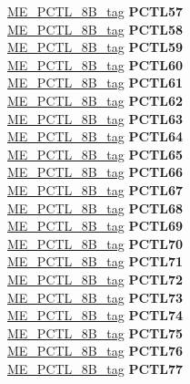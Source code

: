 \begin{DoxyCompactItemize}
\begin{tabbing}
\>\>\mbox{\hyperlink{unionME__PCTL__8B__tag}{ME\_PCTL\_8B\_tag}} {\bfseries PCTL57}\\
\>\>\mbox{\hyperlink{unionME__PCTL__8B__tag}{ME\_PCTL\_8B\_tag}} {\bfseries PCTL58}\\
\>\>\mbox{\hyperlink{unionME__PCTL__8B__tag}{ME\_PCTL\_8B\_tag}} {\bfseries PCTL59}\\
\>\>\mbox{\hyperlink{unionME__PCTL__8B__tag}{ME\_PCTL\_8B\_tag}} {\bfseries PCTL60}\\
\>\>\mbox{\hyperlink{unionME__PCTL__8B__tag}{ME\_PCTL\_8B\_tag}} {\bfseries PCTL61}\\
\>\>\mbox{\hyperlink{unionME__PCTL__8B__tag}{ME\_PCTL\_8B\_tag}} {\bfseries PCTL62}\\
\>\>\mbox{\hyperlink{unionME__PCTL__8B__tag}{ME\_PCTL\_8B\_tag}} {\bfseries PCTL63}\\
\>\>\mbox{\hyperlink{unionME__PCTL__8B__tag}{ME\_PCTL\_8B\_tag}} {\bfseries PCTL64}\\
\>\>\mbox{\hyperlink{unionME__PCTL__8B__tag}{ME\_PCTL\_8B\_tag}} {\bfseries PCTL65}\\
\>\>\mbox{\hyperlink{unionME__PCTL__8B__tag}{ME\_PCTL\_8B\_tag}} {\bfseries PCTL66}\\
\>\>\mbox{\hyperlink{unionME__PCTL__8B__tag}{ME\_PCTL\_8B\_tag}} {\bfseries PCTL67}\\
\>\>\mbox{\hyperlink{unionME__PCTL__8B__tag}{ME\_PCTL\_8B\_tag}} {\bfseries PCTL68}\\
\>\>\mbox{\hyperlink{unionME__PCTL__8B__tag}{ME\_PCTL\_8B\_tag}} {\bfseries PCTL69}\\
\>\>\mbox{\hyperlink{unionME__PCTL__8B__tag}{ME\_PCTL\_8B\_tag}} {\bfseries PCTL70}\\
\>\>\mbox{\hyperlink{unionME__PCTL__8B__tag}{ME\_PCTL\_8B\_tag}} {\bfseries PCTL71}\\
\>\>\mbox{\hyperlink{unionME__PCTL__8B__tag}{ME\_PCTL\_8B\_tag}} {\bfseries PCTL72}\\
\>\>\mbox{\hyperlink{unionME__PCTL__8B__tag}{ME\_PCTL\_8B\_tag}} {\bfseries PCTL73}\\
\>\>\mbox{\hyperlink{unionME__PCTL__8B__tag}{ME\_PCTL\_8B\_tag}} {\bfseries PCTL74}\\
\>\>\mbox{\hyperlink{unionME__PCTL__8B__tag}{ME\_PCTL\_8B\_tag}} {\bfseries PCTL75}\\
\>\>\mbox{\hyperlink{unionME__PCTL__8B__tag}{ME\_PCTL\_8B\_tag}} {\bfseries PCTL76}\\
\>\>\mbox{\hyperlink{unionME__PCTL__8B__tag}{ME\_PCTL\_8B\_tag}} {\bfseries PCTL77}\\

\end{tabbing}
\end{DoxyCompactItemize}
